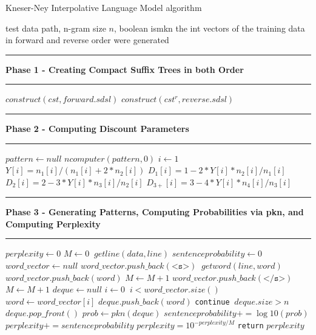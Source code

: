 \documentclass[11pt]{article}
\newcommand\Algphase[1]{%
\vspace*{-.7\baselineskip}\Statex\hspace*{\dimexpr-\algorithmicindent-2pt\relax}\rule{\textwidth}{0.1pt}%
\Statex\hspace*{-\algorithmicindent}\textbf{#1}%
\vspace*{-.7\baselineskip}\Statex\hspace*{\dimexpr-\algorithmicindent-2pt\relax}\rule{\textwidth}{0.1pt}%
}
\newcommand*{\LargerCdot}{\raisebox{-0.75ex}{\scalebox{2}{$\cdot$}}}
\begin{document}
\begin{algorithm*}\footnotesize
\caption{Kneser-Ney Interpolative Language Model algorithm}
\begin{algorithmic}[1]
\Require test data path, n-gram size $n$, boolean ismkn
\Ensure the int vectors of the training data in forward and reverse order were generated

\Algphase{Phase 1 - Creating Compact Suffix Trees in both Order}
\State $construct(cst, forward.sdsl)$
\State $construct(cst^r, reverse.sdsl)$

\Algphase{Phase 2 - Computing Discount Parameters}
\State $pattern \gets null$
\State $ncomputer(pattern,0)$\Comment{Computes $n_1,n_2,n_3,n_4,N_{1+}(\LargerCdot\LargerCdot),N_{3+}(\LargerCdot)$}
\State $i\gets 1$
\State $Y[i]=n_1[i]/(n_1[i]+2*n_2[i])$
\State $D_1[i] = 1 - 2 * Y[i] * n_2[i]/n_1[i]$
\State $D_2[i] = 2 - 3 * Y[i] * n_3[i]/n_2[i]$
\State $D_{3+}[i] = 3 - 4 * Y[i] * n_4[i]/n_3[i]$
\EndIf
\EndWhile

\Algphase{Phase 3 - Generating Patterns, Computing Probabilities via pkn, and Computing Perplexity}
\State $perplexity \gets 0$
\State $M\gets0$
\While $\ getline(data,line)$
	\State $sentenceprobability \gets 0$
	\State $word\_vector \gets null$
	\State $word\_vector.push\_back(\texttt{<s>})$
	\While $\ getword(line,word)$
		\State $word\_vector.push\_back(word)$
		\State $M\gets M+1$
	\EndWhile
	\State $word\_vector.push\_back(\texttt{</s>})$
	\State $M\gets M+1$
	\State $deque\gets null$
	\State $i\gets 0$
	\While $\ i<word\_vector.size()$
		\State $word\gets word\_vector[i]$
		\State $deque.push\_back(word)$
			\State \texttt{continue}
		\EndIf
		\While $\ deque.size > n$
			\State $deque.pop\_front()$
		\EndWhile
		\State $prob \gets pkn(deque)$
		\State $sentenceprobability+=\log10(prob)$
	\EndWhile
	\State $perplexity+=sentenceprobability$
\EndWhile
\State $perplexity=10^{-perplexity/M}$
\State \texttt{return} $perplexity$
\EndProcedure
\end{algorithmic}
\end{algorithm*}
\end{document}
